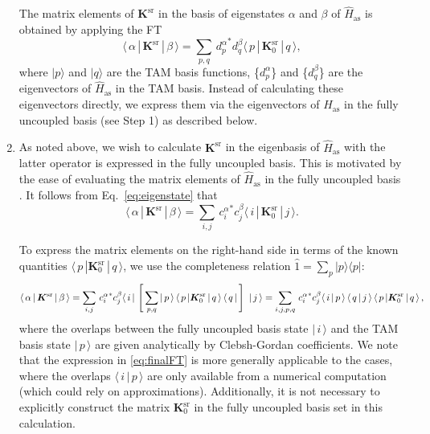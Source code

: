 \documentclass[reprint,amssymb,noeprint,twocolumn,longbibliography]{revtex4-2}
\begin{document}
\begin{enumerate}
\vspace{0.2cm}
{
The matrix elements of $\bm{K}^\text{sr}$ in the basis of eigenstates $\alpha$ and $\beta$ of $\hat{H}_{\text{as}}$ is obtained by applying the FT
\begin{equation}
\label{eq:FT}
\langle\, \alpha\, |\, \bm{K}^\text{sr}\, |\, \beta\, \rangle =  \sum_{p,q}^{}\, {d_p^\alpha}^\ast d_q^\beta \langle\, p\, |\, \bm{K}_0^\text{sr}\, |\, q\, \rangle,
\end{equation}
where $|p\rangle$ and $|q\rangle$ are the TAM basis functions, \{$d_p^\alpha$\} and \{$d_q^\beta$\} are the eigenvectors of $\hat{H}_{\text{as}}$ in the TAM basis. Instead of calculating these eigenvectors directly, we express them via the eigenvectors of $\hat{H}_{\text{as}}$ in the fully uncoupled basis (see Step 1) as described below. 
}

\item

As noted above, we wish to calculate $\bm{K}^\text{sr}$ in the eigenbasis of $\hat{H}_{\text{as}}$ with the latter operator is expressed in the fully uncoupled basis. This is motivated by the ease of evaluating  the matrix elements of $\hat{H}_{\text{as}}$ in the fully uncoupled basis \cite{Krems_04}.   
It follows from Eq.~\eqref{eq:eigenstate} that 
\begin{equation}
\label{eq:uncFT}
\langle\, \alpha\, |\, \bm{K}^\text{sr}\, |\, \beta\, \rangle =  \sum_{i,j}^{}\, {c_i^\alpha}^\ast c_j^\beta \langle\, i\, |\, \bm{K}_0^\text{sr}\, |\, j\, \rangle.
\end{equation}

To express the matrix elements on the right-hand side in terms of the known quantities $\langle\, p\, |\bm{K}_0^\text{sr}\,|\, q\, \rangle$, we use the completeness relation $\hat{1}=\sum_p |p\rangle \langle p|$:
\begin{equation}
\label{eq:finalFT}
\langle\, \alpha\, |\, \bm{K}^\text{sr}\, |\, \beta\, \rangle =  \sum_{i,j}^{}\,{c_i^\alpha}^\ast c_j^\beta \langle\, i\, |\,  \left[\, \sum_{p,q}^{} |\,p\,\rangle\,\langle\, p\, |\bm{K}_0^\text{sr}\,|\, q\, \rangle\,\langle\, q\, |\, \right]\ |\, j\, \rangle \\
 =  \sum_{i,j,p,q}^{}\, {c_i^\alpha}^\ast c_j^\beta \langle\, i\, |\,p\,\rangle\, \langle\, q\, |\,j\,\rangle\,  \langle\, p\, |\bm{K}_0^\text{sr}\,|\, q\, \rangle\, ,
\end{equation}
where the overlaps between the fully uncoupled basis state $|\,i\,\rangle$ and the TAM basis state $|\,p\,\rangle$ are given analytically by Clebsh-Gordan coefficients. We note that the expression in \cref{eq:finalFT} is more generally  applicable to the cases, where the  overlaps $\langle\, i\, |\,p\,\rangle$ are only available from a numerical computation (which could rely on approximations). Additionally, it is not necessary to explicitly construct the matrix $\bm{K}_0^\text{sr}$ in the fully uncoupled basis set in this calculation.   

\end{enumerate}
\end{document}
